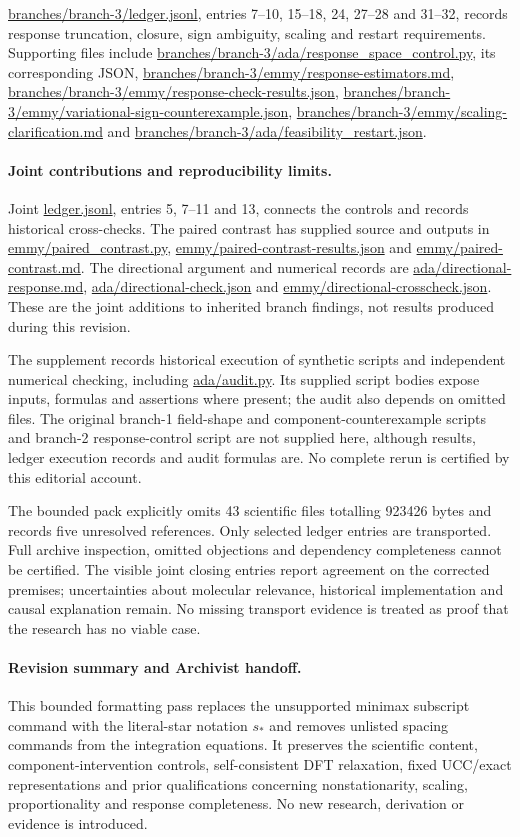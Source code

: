 \documentclass{article}
\begin{document}
\url{branches/branch-3/ledger.jsonl}, entries 7--10, 15--18, 24, 27--28 and 31--32, records response truncation, closure, sign ambiguity, scaling and restart requirements. Supporting files include \url{branches/branch-3/ada/response_space_control.py}, its corresponding JSON, \url{branches/branch-3/emmy/response-estimators.md}, \url{branches/branch-3/emmy/response-check-results.json}, \url{branches/branch-3/emmy/variational-sign-counterexample.json}, \url{branches/branch-3/emmy/scaling-clarification.md} and \url{branches/branch-3/ada/feasibility_restart.json}.

\paragraph{Joint contributions and reproducibility limits.}
Joint \url{ledger.jsonl}, entries 5, 7--11 and 13, connects the controls and records historical cross-checks. The paired contrast has supplied source and outputs in \url{emmy/paired_contrast.py}, \url{emmy/paired-contrast-results.json} and \url{emmy/paired-contrast.md}. The directional argument and numerical records are \url{ada/directional-response.md}, \url{ada/directional-check.json} and \url{emmy/directional-crosscheck.json}. These are the joint additions to inherited branch findings, not results produced during this revision.

The supplement records historical execution of synthetic scripts and independent numerical checking, including \url{ada/audit.py}. Its supplied script bodies expose inputs, formulas and assertions where present; the audit also depends on omitted files. The original branch-1 field-shape and component-counterexample scripts and branch-2 response-control script are not supplied here, although results, ledger execution records and audit formulas are. No complete rerun is certified by this editorial account.

The bounded pack explicitly omits 43 scientific files totalling 923426 bytes and records five unresolved references. Only selected ledger entries are transported. Full archive inspection, omitted objections and dependency completeness cannot be certified. The visible joint closing entries report agreement on the corrected premises; uncertainties about molecular relevance, historical implementation and causal explanation remain. No missing transport evidence is treated as proof that the research has no viable case.

\paragraph{Revision summary and Archivist handoff.}
This bounded formatting pass replaces the unsupported minimax subscript command with the literal-star notation $s_*$ and removes unlisted spacing commands from the integration equations. It preserves the scientific content, component-intervention controls, self-consistent DFT relaxation, fixed UCC/exact representations and prior qualifications concerning nonstationarity, scaling, proportionality and response completeness. No new research, derivation or evidence is introduced.
\end{document}
